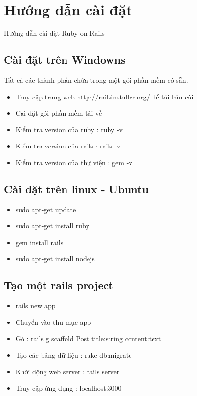 \appendix
\chapter{Hướng dẫn cài đặt}
Hướng dẫn cài đặt Ruby on Rails
\section{Cài đặt trên Windowns}
Tất cả các thành phần chứa trong một gói phần mềm có sẵn.
\begin{itemize}
\item Truy cập trang web http://railsinstaller.org/ để tải bản cài
\item Cài đặt gói phần mềm tải về
\item Kiểm tra version của ruby : ruby -v
\item Kiểm tra version của rails : rails -v
\item Kiểm tra version của thư viện : gem -v
\end{itemize}
\section{Cài đặt trên linux - Ubuntu}
\begin{itemize}
\item sudo apt-get update
\item sudo apt-get install ruby
\item gem install rails
\item sudo apt-get install nodejs
\end{itemize}
\section{Tạo một rails project}
\begin{itemize}
\item rails new app
\item Chuyển vào thư mục app
\item Gõ : rails g scaffold Post title:string content:text
\item Tạo các bảng dữ liệu : rake db:migrate
\item Khởi động web server : rails server
\item Truy cập ứng dụng : localhost:3000
\end{itemize}